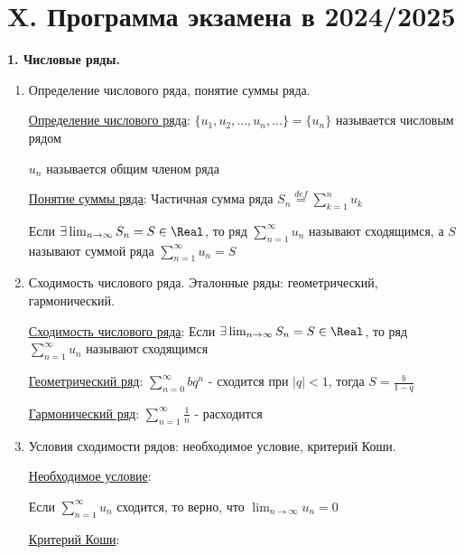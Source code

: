 \clearpage

\section{X. Программа экзамена в 2024/2025}

\begin{center}
    \textbf{1. Числовые ряды.}
\end{center}

\begin{enumerate}
    \item Определение числового ряда, понятие суммы ряда.

    \hyperlink{numberseriesdefinition}{Определение числового ряда}: $\{u_1, u_2, \dots, u_n, \dots\} = \{u_n\}$ называется числовым рядом

    $u_n$ называется общим членом ряда
    
    \hyperlink{sumofseriesdefinition}{Понятие суммы ряда}: Частичная сумма ряда $S_n \stackrel{def}{=} \sum_{k = 1}^{n} u_k$

    Если $\exists \lim_{n \to\infty} S_n = S \in \Real$, то ряд $\sum_{n = 1}^\infty u_n$ называют сходящимся,
    а $S$ называют суммой ряда $\sum_{n = 1}^\infty u_n = S$

    \item Сходимость числового ряда. Эталонные ряды: геометрический, гармонический.

    \hyperlink{seriesconvergence}{Сходимость числового ряда}: Если $\exists \lim_{n \to\infty} S_n = S \in \Real$, то ряд $\sum_{n = 1}^\infty u_n$ называют сходящимся

    \hyperlink{geometricseries}{Геометрический ряд}: $\sum_{n = 0}^\infty b q^n$ - сходится при $|q| < 1$, тогда $S = \frac{b}{1 - q}$
    
    \hyperlink{harmonicseries}{Гармонический ряд}: $\sum_{n = 1}^\infty \frac{1}{n}$ - расходится

    \item Условия сходимости рядов: необходимое условие, критерий Коши.

    \hyperlink{necessarycondition}{Необходимое условие}: 

    \begin{MyTheorem}
        \Ths Если $\sum_{n = 1}^\infty u_n$ сходится, то верно, что $\lim_{n \to \infty} u_n = 0$
    \end{MyTheorem}

    \hyperlink{cauchycriteria}{Критерий Коши}:


\end{enumerate}
